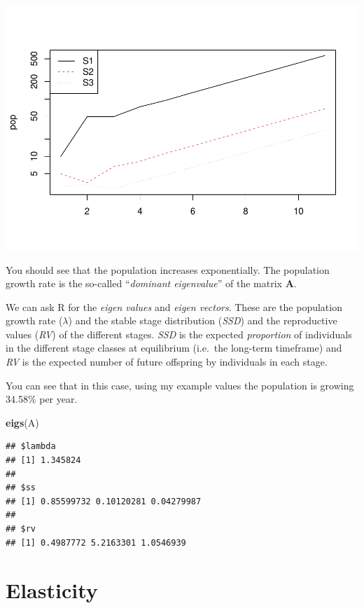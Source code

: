 \documentclass[
  a4paper]{book}
\newenvironment{Shaded}{\begin{snugshade}}{\end{snugshade}}
\newcommand{\FunctionTok}[1]{\textcolor[rgb]{0.13,0.29,0.53}{\textbf{#1}}}
\newcommand{\NormalTok}[1]{#1}
\begin{document}
\includegraphics{BB512_files/figure-latex/plotprojectiongraph-1.pdf}

You should see that the population increases exponentially. The population growth rate is the so-called ``\emph{dominant eigenvalue}'' of the matrix \textbf{A}.

We can ask R for the \emph{eigen values} and \emph{eigen vectors}. These are the population growth rate (\(\lambda\)) and the stable stage distribution (\emph{SSD}) and the reproductive values (\emph{RV}) of the different stages. \emph{SSD} is the expected \emph{proportion} of individuals in the different stage classes at equilibrium (i.e.~the long-term timeframe) and \emph{RV} is the expected number of future offspring by individuals in each stage.

You can see that in this case, using my example values the population is growing 34.58\% per year.

\begin{Shaded}
\begin{Highlighting}[]
\FunctionTok{eigs}\NormalTok{(A)}
\end{Highlighting}
\end{Shaded}

\begin{verbatim}
## $lambda
## [1] 1.345824
## 
## $ss
## [1] 0.85599732 0.10120281 0.04279987
## 
## $rv
## [1] 0.4987772 5.2163301 1.0546939
\end{verbatim}

\section{Elasticity}\label{elasticity}
\end{document}
